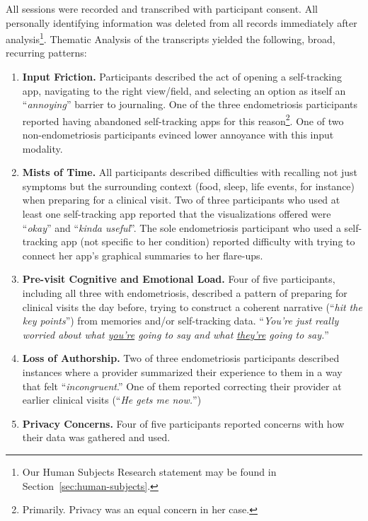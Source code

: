 All sessions were recorded and transcribed with participant consent. All personally identifying information was deleted from all records immediately after analysis\footnote{Our Human Subjects Research statement may be found in Section~\ref{sec:human-subjects}.}. Thematic Analysis of the transcripts yielded the following, broad, recurring patterns:

\begin{enumerate}
  \item \textbf{Input Friction.} Participants described the act of opening a self-tracking app, navigating to the right view/field, and selecting an option as itself an ``\textit{annoying}'' barrier to journaling. One of the three endometriosis participants reported having abandoned self-tracking apps for this reason\footnote{Primarily. Privacy was an equal concern in her case.}. One of two non-endometriosis participants evinced lower annoyance with this input modality.
  \item \textbf{Mists of Time.} All participants described difficulties with recalling not just symptoms but the surrounding context (food, sleep, life events, for instance) when preparing for a clinical visit. Two of three participants who used at least one self-tracking app reported that the visualizations offered were ``\textit{okay}'' and ``\textit{kinda useful}''. The sole endometriosis participant who used a self-tracking app (not specific to her condition) reported difficulty with trying to connect her app's graphical summaries to her flare-ups.
  \item \textbf{Pre-visit Cognitive and Emotional Load.} Four of five participants, including all three with endometriosis, described a pattern of preparing for clinical visits the day before, trying to construct a coherent narrative (``\textit{hit the key points}'') from memories and/or self-tracking data. ``\textit{You're just really worried about what \underline{you're} going to say and what \underline{they're} going to say.}''
  \item \textbf{Loss of Authorship.} Two of three endometriosis participants described instances where a provider summarized their experience to them in a way that felt ``\textit{incongruent}.'' One of them reported correcting their provider at earlier clinical visits (``\textit{He gets me now.}'')
  \item \textbf{Privacy Concerns.} Four of five participants reported concerns with how their data was gathered and used.
\end{enumerate}

